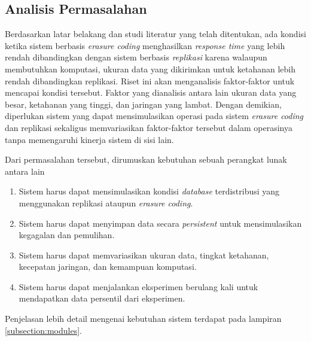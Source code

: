 \subsection{Analisis Permasalahan}
\label{sec:analisis-permasalahan}


Berdasarkan latar belakang dan studi literatur yang telah ditentukan, ada kondisi ketika sistem berbasis \textit{erasure coding} menghasilkan \textit{response time} yang lebih rendah dibandingkan dengan sistem berbasis \textit{replikasi} karena walaupun membutuhkan komputasi, ukuran data yang dikirimkan untuk ketahanan lebih rendah dibandingkan replikasi. Riset ini akan menganalisis faktor-faktor untuk mencapai kondisi tersebut. Faktor yang dianalisis antara lain ukuran data yang besar, ketahanan yang tinggi, dan jaringan yang lambat. Dengan demikian, diperlukan sistem yang dapat mensimulasikan operasi pada sistem \textit{erasure coding} dan replikasi sekaligus memvariasikan faktor-faktor tersebut dalam operasinya tanpa memengaruhi kinerja sistem di sisi lain.

Dari permasalahan tersebut, dirumuskan kebutuhan sebuah perangkat lunak antara lain
\begin{enumerate}

    \item Sistem harus dapat mensimulasikan kondisi \textit{database} terdistribusi yang menggunakan replikasi ataupun \textit{erasure coding}.
    \item Sistem harus dapat menyimpan data secara \textit{persistent} untuk mensimulasikan kegagalan dan pemulihan.
    \item Sistem harus dapat memvariasikan ukuran data, tingkat ketahanan, kecepatan jaringan, dan kemampuan komputasi.
    \item Sistem harus dapat menjalankan eksperimen berulang kali untuk mendapatkan data persentil dari eksperimen.
    
\end{enumerate}

Penjelasan lebih detail mengenai kebutuhan sistem terdapat pada lampiran \ref{subsection:modules}.
